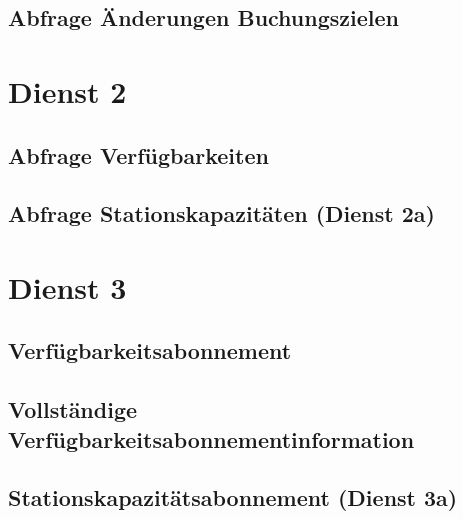 \subsection*{Abfrage Änderungen Buchungszielen}
\label{subsec:Nachrichten:Dienst1:ChangeProviders}



\section{Dienst 2}
\label{subsec:Nachrichten:Dienst2}

\subsection*{Abfrage Verfügbarkeiten}
\label{subsec:Nachrichten:Dienst2:Availability}



\subsection*{Abfrage Stationskapazitäten (Dienst 2a)}
\label{subsec:Nachrichten:Dienst2:PlaceAvailability}



\section{Dienst 3}
\label{subsec:Nachrichten:Dienst3}

\subsection*{Verfügbarkeitsabonnement}
\label{subsec:Nachrichten:Dienst3:AvailabilitySubscription}




\subsection*{Vollständige Verfügbarkeitsabonnementinformation}
\label{subsec:Nachrichten:Dienst3:CompleteAvailability}




\subsection*{Stationskapazitätsabonnement (Dienst 3a)}
\label{subsec:Nachrichten:Dienst3:AvailabilitySubscription}




